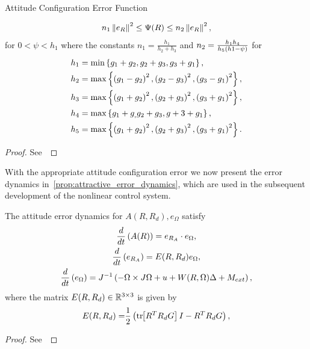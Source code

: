 \begin{prop}{Attitude Configuration Error Function}
\begin{enumerate}
    \begin{align}\label{eq:A_bound}
        n_1 \left\| e_R \right\|^2 \leq \Psi(R) \leq n_2 \left\| e_R \right\|^2 ,
    \end{align}
    for $0<\psi < h_1 $ where the constants \( n_1 = \frac{h_1}{h_2 + h_3} \) and \( n_2 = \frac{h_1 h_4}{h_5 \left( h1 - \psi \right) }\) for
	\begin{align*}
		h_1 &= \min\left\{ g_1 + g_2, g_2 + g_3 , g_3 + g_1 \right\} ,\\
		h_2 &= \max\left\{ \left( g_1 -g_2 \right)^2,\left( g_2 -g_3 \right)^2 , \left( g_3 -g_1 \right)^2 \right\} ,\\
		h_3 &= \max\left\{ \left( g_1 + g_2 \right)^2, \left( g_2 + g_3 \right)^2 , \left( g_3 + g_1 \right)^2 \right\}, \\		
        h_4 &= \max\left\{ g_1 + g_, g_2 +g_3, g+3 + g_1 \right\}, \\
        h_5 &= \max\left\{ \left( g_1 + g_2 \right)^2, \left( g_2 + g_3 \right)^2, \left( g_3 + g_1 \right)^2 \right\}.
	\end{align*}
\end{enumerate}
\end{prop}
\begin{proof}
    See~
\end{proof}

With the appropriate attitude configuration error we now present the error dynamics in~\cref{prop:attractive_error_dynamics}, which are used in the subsequent development of the nonlinear control system.
\begin{prop}\label{prop:attractive_error_dynamics}
    The attitude error dynamics for \( A(R, R_d), e_\Omega \) satisfy
	\begin{gather}
    	\frac{d }{d t} \left( A(R) \right) = e_{R_A} \cdot e_\Omega , \label{eqn:A_dot} \\
		\frac{d }{d t} \left( e_{R_A} \right) = E(R, R_d) e_\Omega , \label{eqn:eRA_dot} \\
        \frac{d }{d t} \left( e_\Omega \right) = J^{-1} \left( -\Omega \times J \Omega + u + W(R, \Omega) \Delta + M_{ext} \right) , \label{eqn:eW_dot}
	\end{gather}
	where the matrix \(E(R,R_d)\in \mathbb{R}^{3\times3} \) is given by
	\begin{align}
		E(R,R_d) = &\frac{1}{2} \left( \mathrm{tr}\negthickspace\left[ R^T R_d G \right]I - R^T R_d G \right) , \label{eqn:E} \\
	\end{align}
\end{prop}
\begin{proof}
    See~
\end{proof}

